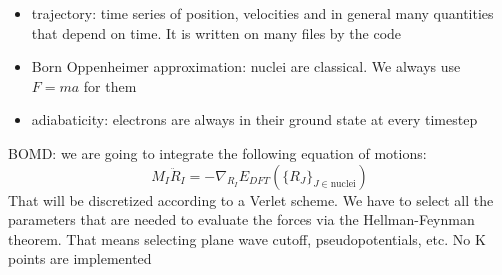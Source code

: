\documentclass[landscape]{foils}
\begin{document}
\begin{itemize}
\item trajectory: time series of position, velocities and in general many quantities that depend on time. It is written on many files by the code
\item Born Oppenheimer approximation: nuclei are classical. We always use $F=ma$ for them
\item adiabaticity: electrons are always in their ground state at every timestep
\end{itemize}

BOMD: we are going to integrate the following equation of motions:
\begin{equation}
	M_I\ddot R_I = -\nabla_{R_I} E_{DFT}(\{R_J\}_{J\in\text{nuclei}})
\end{equation}
That will be discretized according to a Verlet scheme. We have to select all the parameters that are needed to evaluate the forces via the Hellman-Feynman theorem.
That means selecting plane wave cutoff, pseudopotentials, etc. No K points are implemented
\end{document}
